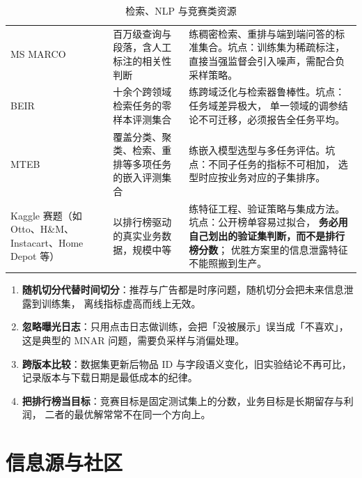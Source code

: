 \begin{table}[htbp]
\centering
\caption{检索、NLP 与竞赛类资源}
\label{tab:datasets-ir}
\small
\begin{tabularx}{\textwidth}{L{2.1cm} L{2.4cm} Y}
\toprule
{} &  &  \\
\midrule
MS MARCO &
百万级查询与段落，含人工标注的相关性判断 &
练稠密检索、重排与端到端问答的标准集合。坑点：训练集为稀疏标注，
直接当强监督会引入噪声，需配合负采样策略。 \\
BEIR &
十余个跨领域检索任务的零样本评测集合 &
练跨域泛化与检索器鲁棒性。坑点：任务域差异极大，
单一领域的调参结论不可迁移，必须报告全任务平均。 \\
MTEB &
覆盖分类、聚类、检索、重排等多项任务的嵌入评测集合 &
练嵌入模型选型与多任务评估。坑点：不同子任务的指标不可相加，
选型时应按业务对应的子集排序。 \\
Kaggle 赛题（如 Otto、H\&M、Instacart、Home Depot 等） &
以排行榜驱动的真实业务数据，规模中等 &
练特征工程、验证策略与集成方法。坑点：公开榜单容易过拟合，
\textbf{务必用自己划出的验证集判断，而不是排行榜分数}；
优胜方案里的信息泄露特征不能照搬到生产。 \\
\bottomrule
\end{tabularx}
\end{table}

\begin{pitfall}[数据集使用的四个高频错误]
\begin{enumerate}
  \item \textbf{随机切分代替时间切分}：推荐与广告都是时序问题，随机切分会把未来信息泄露到训练集，
        离线指标虚高而线上无效。
  \item \textbf{忽略曝光日志}：只用点击日志做训练，会把「没被展示」误当成「不喜欢」，
        这是典型的 MNAR 问题，需要负采样与消偏处理。
  \item \textbf{跨版本比较}：数据集更新后物品 ID 与字段语义变化，旧实验结论不再可比，
        记录版本与下载日期是最低成本的纪律。
  \item \textbf{把排行榜当目标}：竞赛目标是固定测试集上的分数，业务目标是长期留存与利润，
        二者的最优解常常不在同一个方向上。
\end{enumerate}
\end{pitfall}

\section{信息源与社区}

